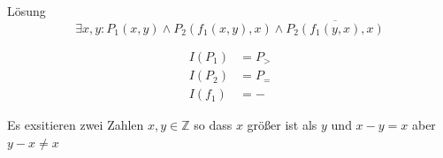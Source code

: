 {\begin{frame}{Lösung}
	$$\exists x,y: P_1(x,y) \wedge P_2(f_1(x,y),x) \wedge \overline{P_2(f_1(y,x),x)}$$

	\begin{align*}
		I(P_1) & = P_{>} \\
		I(P_2) & = P_{=} \\
		I(f_1) & = -
	\end{align*}

	Es exsitieren zwei Zahlen $x,y \in \mathbb Z$ so dass $x$ größer ist als $y$ und $x-y=x$ aber $y-x\neq x$

\end{frame}
}



